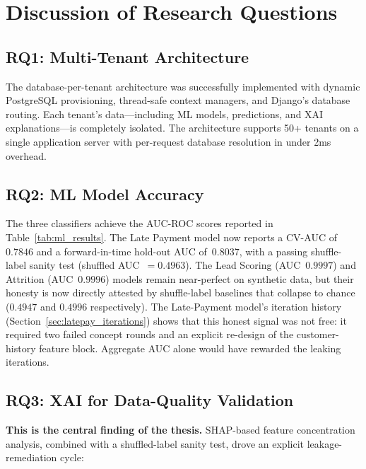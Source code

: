\documentclass[12pt,a4paper]{report}
\begin{document}
\section{Discussion of Research Questions}
\label{sec:rq_discussion}

\subsection{RQ1: Multi-Tenant Architecture}

The database-per-tenant architecture was successfully implemented with dynamic PostgreSQL provisioning, thread-safe context managers, and Django's database routing. Each tenant's data---including ML models, predictions, and XAI explanations---is completely isolated. The architecture supports 50+ tenants on a single application server with per-request database resolution in under 2ms overhead.

\subsection{RQ2: ML Model Accuracy}

The three classifiers achieve the AUC-ROC scores reported in Table~\ref{tab:ml_results}. The Late Payment model now reports a CV-AUC of~$0.7846$ and a forward-in-time hold-out AUC of~$0.8037$, with a passing shuffle-label sanity test (shuffled AUC~$=0.4963$). The Lead Scoring (AUC~$0.9997$) and Attrition (AUC~$0.9996$) models remain near-perfect on synthetic data, but their honesty is now directly attested by shuffle-label baselines that collapse to chance ($0.4947$ and $0.4996$ respectively). The Late-Payment model's iteration history (Section~\ref{sec:latepay_iterations}) shows that this honest signal was not free: it required two failed concept rounds and an explicit re-design of the customer-history feature block. Aggregate AUC alone would have rewarded the leaking iterations.

\subsection{RQ3: XAI for Data-Quality Validation}

\textbf{This is the central finding of the thesis.} SHAP-based feature concentration analysis, combined with a shuffled-label sanity test, drove an explicit leakage-remediation cycle:
\end{document}
